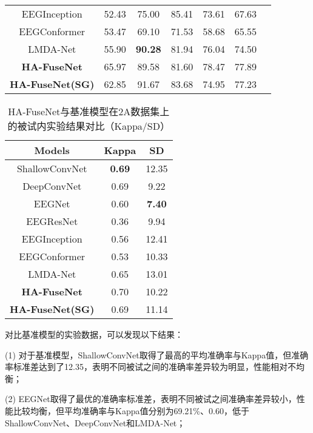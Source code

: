 \begin{table}[ht]
\begin{subtable}[ht]{\textwidth}
\begin{tabularx}{\textwidth}{cCCCCCC}
        EEGInception\cite{zhang2021eeg} & 52.43 & 75.00 & 85.41 & 73.61 & 67.63 \\
        EEGConformer\cite{song2022eeg} & 53.47 & 69.10 & 71.53 & 58.68 & 65.55 \\
        LMDA-Net\cite{miao2023lmda} & 55.90 & \textbf{90.28} & 81.94 & 76.04 & 74.50 \\
        \midrule 
        \textbf{HA-FuseNet}  & 65.97 & 89.58 & 81.60 & 78.47 & 77.89 \\
        \textbf{HA-FuseNet(SG)}  & 62.85 & 91.67 & 83.68 & 74.95 & 77.23 \\
        \bottomrule
      \end{tabularx}
    \end{subtable}
\end{table}
\begin{table}[H]
    \centering
    \caption{HA-FuseNet与基准模型在2A数据集上的被试内实验结果对比（Kappa/SD）}
    \label{tab:2acompareinsd}
    \begin{tabularx}{\textwidth}{CCC}
      \toprule
      Models & Kappa & SD \\
      \midrule
      ShallowConvNet\cite{schirrmeister2017deep} & \textbf{0.69} & 12.35\\
      DeepConvNet\cite{schirrmeister2017deep} & 0.69 & 9.22 \\
      EEGNet\cite{lawhern2018eegnet} & 0.60 & \textbf{7.40} \\
      EEGResNet\cite{HBM:HBM23730} & 0.36 & 9.94 \\
      EEGInception\cite{zhang2021eeg} & 0.56 & 12.41 \\
      EEGConformer\cite{song2022eeg} & 0.53 & 10.33 \\
      LMDA-Net\cite{miao2023lmda} & 0.65 & 13.01 \\
      \midrule 
      \textbf{HA-FuseNet} &0.70&10.22\\
      \textbf{HA-FuseNet(SG)} &0.69&11.14\\
      \bottomrule
    \end{tabularx}
\end{table}

对比基准模型的实验数据，可以发现以下结果：

(1) 对于基准模型，ShallowConvNet取得了最高的平均准确率与Kappa值，但准确率标准差达到了12.35，表明不同被试之间的准确率差异较为明显，性能相对不均衡；

(2) EEGNet取得了最优的准确率标准差，表明不同被试之间准确率差异较小，性能比较均衡，但平均准确率与Kappa值分别为69.21\%、0.60，低于ShallowConvNet、DeepConvNet和LMDA-Net；

